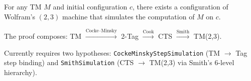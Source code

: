 \begin{theorem}\label{thm:wolfram23}
\notready
For any TM $M$ and initial configuration $c$, there exists a configuration of
Wolfram's $(2,3)$ machine that simulates the computation of $M$ on $c$.

The proof composes:
TM $\xrightarrow{\text{Cocke--Minsky}}$ 2-Tag
$\xrightarrow{\text{Cook}}$ CTS
$\xrightarrow{\text{Smith}}$ TM(2,3).

Currently requires two hypotheses:
\texttt{CockeMinskyStepSimulation} (TM $\to$ Tag step binding) and
\texttt{SmithSimulation} (CTS $\to$ TM(2,3) via Smith's 6-level hierarchy).
\end{theorem}
